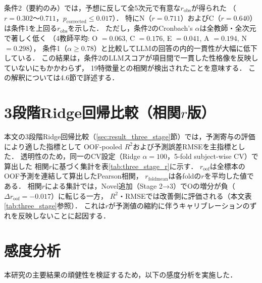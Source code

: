 \documentclass[dvipdfmx,11pt,a4paper]{bxjsarticle}
\begin{document}
条件2（要約のみ）では，予想に反して全5次元で有意な$r_{\text{obs}}$が得られた
（$r = 0.302$〜$0.711$，$p_{\text{corrected}} \leq 0.017$）．
特にN（$r = 0.711$）およびC（$r = 0.640$）は条件1を上回る$r_{\text{obs}}$を示した．
ただし，条件2のCronbach's $\alpha$は全教師・全次元で著しく低く
（4教師平均: O $= 0.063$, C $= 0.176$, E $= 0.041$, A $= 0.194$, N $= 0.298$），
条件1（$\alpha \geq 0.78$）と比較してLLMの回答の内的一貫性が大幅に低下している．
この結果は，条件2のLLMスコアが項目間で一貫した性格像を反映していないにもかかわらず，
19特徴量との相関が検出されたことを意味する．
この解釈については4.6節で詳述する．



\section{3段階Ridge回帰比較（相関$r$版）}
\label{sec:appendix_three_stage_r}
本文の3段階Ridge回帰比較（\ref{sec:result_three_stage}節）では，予測寄与の評価により適した指標として
OOF-pooled $R^2$および予測誤差RMSEを主指標とした．
透明性のため，同一のCV設定（Ridge $\alpha=100$，5-fold subject-wise CV）で算出した
相関$r$に基づく集計を表\ref{tab:three_stage_r}に示す．
$r_{\text{oof}}$は全標本のOOF予測を連結して算出したPearson相関，
$r_{\text{foldmean}}$は各foldの$r$を平均した値である．
相関$r$による集計では，Novel追加（Stage 2→3）でOの増分が負（$\Delta r_{\text{oof}} = -0.017$）に転じる一方，
$R^2$・RMSEでは改善側に評価される（本文表\ref{tab:three_stage}参照）．
これは$r$が予測値の縮約に伴うキャリブレーションのずれを反映しないことに起因する．

\begin{table}[htbp]
\centering
\caption{3段階Ridge回帰比較（相関$r$版・参考）．
$r_{\text{oof}}$はOOF予測連結によるPearson相関，
$r_{\text{foldmean}}$は5-fold平均，$\Delta r_{\text{oof}}$は隣接ステージ間の増分．}
\label{tab:three_stage_r}

\end{table}

\section{感度分析}
\label{sec:appendix_sensitivity}

本研究の主要結果の頑健性を検証するため，以下の感度分析を実施した．
\end{document}
